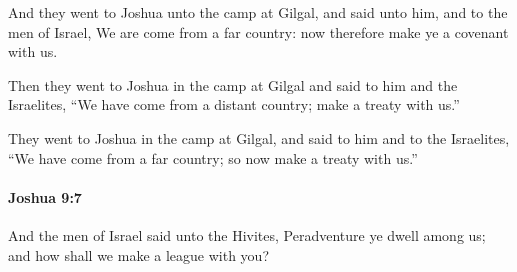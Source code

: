 			\begin{versebox}
					\item[BHS] 
					\item[ASV] And they went to Joshua unto the camp at Gilgal, and said unto him, and to the men of Israel, We are come from a far country: now therefore make ye a covenant with us.
					\item[NIV] Then they went to Joshua in the camp at Gilgal and said to him and the Israelites, “We have come from a distant country; make a treaty with us.”
					\item[NRSV] They went to Joshua in the camp at Gilgal, and said to him and to the Israelites, “We have come from a far country; so now make a treaty with us.”
			\end{versebox}

		\paragraph{Joshua 9:7} %
			\label{JOSHUA-9-7}

			And the men of Israel said unto the Hivites, Peradventure ye dwell among us; and how shall we make a league with you?

